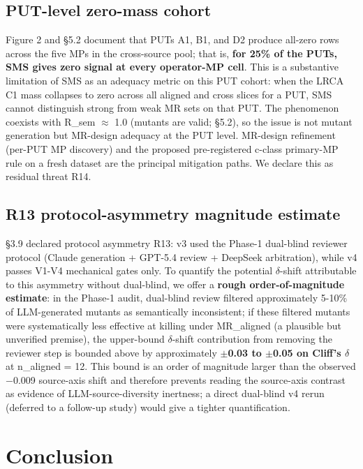 \documentclass[manuscript,screen,review]{acmart}
\begin{document}
\subsection{PUT-level zero-mass cohort}\label{put-level-zero-mass-cohort}

Figure 2 and §5.2 document that PUTs A1, B1, and D2 produce all-zero
rows across the five MPs in the cross-source pool; that is,
\textbf{for 25\% of the PUTs, SMS gives zero signal at every operator-MP
cell}. This is a substantive limitation of SMS as an adequacy metric on
this PUT cohort: when the LRCA C1 mass collapses to zero across all
aligned and cross slices for a PUT, SMS cannot distinguish strong from
weak MR sets on that PUT. The phenomenon coexists with R\_sem $\approx$ 1.0
(mutants are valid; §5.2), so the issue is not mutant generation but
MR-design adequacy at the PUT level. MR-design refinement (per-PUT
MP discovery) and the proposed pre-registered c-class primary-MP rule
on a fresh dataset are the principal mitigation paths. We declare this
as residual threat R14.

\subsection{R13 protocol-asymmetry magnitude estimate}\label{r13-protocol-asymmetry-magnitude-estimate}

§3.9 declared protocol asymmetry R13: v3 used the Phase-1 dual-blind
reviewer protocol (Claude generation + GPT-5.4 review + DeepSeek
arbitration), while v4 passes V1-V4 mechanical gates only. To quantify
the potential $\delta$-shift attributable to this asymmetry without dual-blind,
we offer a \textbf{rough order-of-magnitude estimate}: in the Phase-1
audit, dual-blind review filtered approximately 5-10\% of LLM-generated
mutants as semantically inconsistent; if these filtered mutants were
systematically less effective at killing under MR\_aligned (a plausible
but unverified premise), the upper-bound $\delta$-shift contribution from
removing the reviewer step is bounded above by approximately
\textbf{$\pm$0.03 to $\pm$0.05 on Cliff's $\delta$} at n\_aligned = 12. This bound is
an order of magnitude larger than the observed $-$0.009 source-axis shift
and therefore prevents reading the source-axis contrast as evidence of
LLM-source-diversity inertness; a direct dual-blind v4 rerun (deferred
to a follow-up study) would give a tighter quantification.


\section{Conclusion}\label{conclusion}
\end{document}
